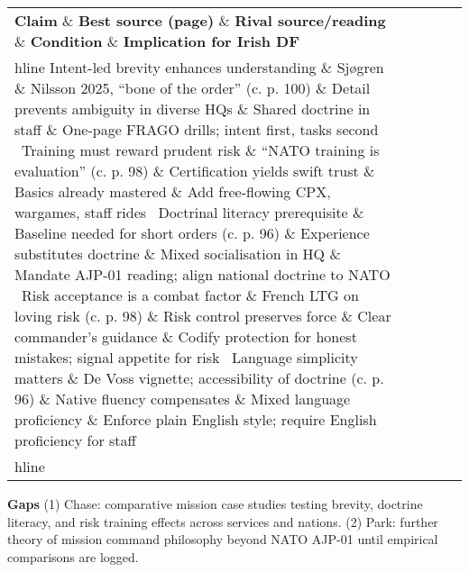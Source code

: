  
\begin{tabular}{p{3.2cm}p{4.2cm}p{3.6cm}p{3.2cm}p{4.2cm}}
	\textbf{Claim} \& \textbf{Best source (page)} \& \textbf{Rival source/reading} \& \textbf{Condition} \& \textbf{Implication for Irish DF}\\hline
	Intent-led brevity enhances understanding \& Sjøgren \& Nilsson 2025, “bone of the order” (c. p. 100) \& Detail prevents ambiguity in diverse HQs \& Shared doctrine in staff \& One-page FRAGO drills; intent first, tasks second \
	Training must reward prudent risk \& “NATO training is evaluation” (c. p. 98) \& Certification yields swift trust \& Basics already mastered \& Add free-flowing CPX, wargames, staff rides \
	Doctrinal literacy prerequisite \& Baseline needed for short orders (c. p. 96) \& Experience substitutes doctrine \& Mixed socialisation in HQ \& Mandate AJP-01 reading; align national doctrine to NATO \
	Risk acceptance is a combat factor \& French LTG on loving risk (c. p. 98) \& Risk control preserves force \& Clear commander’s guidance \& Codify protection for honest mistakes; signal appetite for risk \
	Language simplicity matters \& De Voss vignette; accessibility of doctrine (c. p. 96) \& Native fluency compensates \& Mixed language proficiency \& Enforce plain English style; require English proficiency for staff \\hline
\end{tabular}

\textbf{Gaps}
(1) Chase: comparative mission case studies testing brevity, doctrine literacy, and risk training effects across services and nations.
(2) Park: further theory of mission command philosophy beyond NATO AJP-01 until empirical comparisons are logged.

\parencite{COPELAND_2023}

